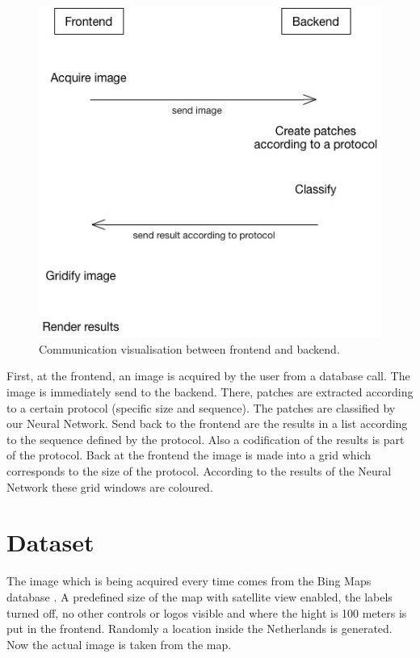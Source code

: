 \documentclass[a4paper,onecolumn]{report}
\begin{document}
\begin{figure}[h!]
    \centering
    \includegraphics[scale=0.5]{./images/communication.jpg}
    \caption{Communication visualisation between frontend and backend.}
	\label{fig:communication}
\end{figure}
\noindent
First, at the frontend, an image is acquired by the user from a database call. The image is immediately send to the backend. There, patches are extracted according to a certain protocol (specific size and sequence). The patches are classified by our Neural Network. Send back to the frontend are the results in a list according to the sequence defined by the protocol. Also a codification of the results is part of the protocol. Back at the frontend the image is made into a grid which corresponds to the size of the protocol. According to the results of the Neural Network these grid windows are coloured.

\section{Dataset}
The image which is being acquired every time comes from the Bing Maps database \cite{bing}. A predefined size of the map with satellite view enabled, the labels turned off, no other controls or logos visible and where the hight is 100 meters is put in the frontend.  Randomly a location inside the Netherlands is generated. Now the actual image is taken from the map.
\end{document}
